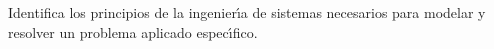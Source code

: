 Identifica los principios de la ingenier\'{\i}a de sistemas necesarios para modelar y resolver un problema aplicado espec\'{\i}fico.